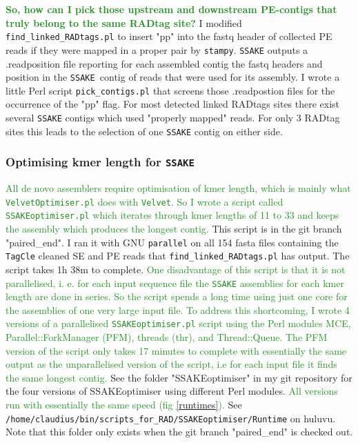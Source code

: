 \documentclass{article}\usepackage[]{graphicx}\usepackage[]{color}
\newcommand{\roger}[1]{ \textcolor[named]{ForestGreen}{#1} }
\begin{document}
\roger{\textbf{So, how can I pick those upstream and downstream PE-contigs that truly belong to the same RADtag site?} }I modified \texttt{find\_linked\_RADtags.pl} to insert "pp" into the fastq header of collected PE reads if they were mapped in a proper pair by \texttt{stampy}. \texttt{SSAKE} outputs a .readposition file reporting for each assembled contig the fastq headers and position in the \texttt{SSAKE }contig of reads that were used for its assembly. I wrote a little Perl script \texttt{pick\_contigs.pl} that screens those .readpostion files for the occurrence of the "pp" flag. For most detected linked RADtags sites there exist several \texttt{SSAKE} contigs which used "properly mapped" reads. For only 3 RADtag sites this leads to the selection of one \texttt{SSAKE} contig on either side. 

\subsubsection{Optimising kmer length for \texttt{SSAKE}}

\roger{All de novo assemblers require optimisation of kmer length, which is mainly what \texttt{VelvetOptimiser.pl} does with \texttt{Velvet}. So I wrote a script called \texttt{SSAKEoptimiser.pl} which iterates through kmer lengths of 11 to 33 and keeps the assembly which produces the longest contig.} This script is in the git branch "paired\_end". I  ran it with GNU \texttt{parallel} on all 154 fasta files containing the \texttt{TagCle} cleaned SE and PE reads that \texttt{find\_linked\_RADtags.pl} has output. The script takes 1h 38m to complete. \roger{One disadvantage of this script is that it is not parallelised, i. e. for each input sequence file the \texttt{SSAKE} assemblies for each kmer length are done in series. So the script spends a long time using just one core for the assemblies of one very large input file. To address this shortcoming, I wrote 4 versions of a parallelised \texttt{SSAKEoptimiser.pl} script using the Perl modules MCE, Parallel::ForkManager (PFM), threads (thr), and Thread::Queue. The PFM version of the script only takes 17 minutes to complete with essentially the same output as the unparallelised version of the script, i.e for each input file it finds the same longest contig.} See the folder "SSAKEoptimiser" in my git repository for the four versions of SSAKEoptimiser using different Perl modules. \roger{All versions run with essentially the same speed (fig \ref{runtimes}).} See \texttt{/home/claudius/bin/scripts\_for\_RAD/SSAKEoptimiser/Runtime} on huluvu. Note that this folder only exists when the git branch "paired\_end" is checked out.
\end{document}
